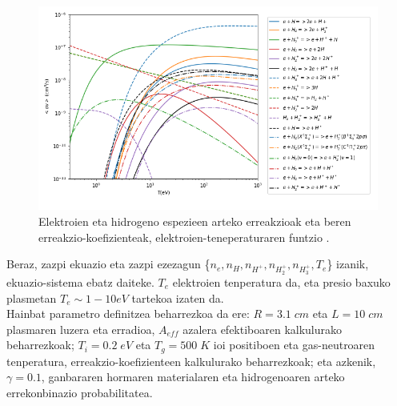\documentclass[12pt]{article}
\numberwithin{figure}{section}
\numberwithin{equation}{section}
\begin{document}
\begin{figure} [h]
    \centering
    \includegraphics[width=0.9\linewidth]{2 - Oinarri teorikoa/hidrogeno erreakzioak.png}
    \caption{Elektroien eta hidrogeno espezieen arteko erreakzioak eta beren erreakzio-koefizienteak, elektroien-teneperaturaren funtzio \cite{elorza_romera_modelo_2022}.}
    \label{fig:plasmaerreakzioak}
\end{figure}

Beraz, zazpi ekuazio eta zazpi ezezagun \{$n_e,n_H,n_{H^+},n_{H_2^+}, n_{H_3^+}, T_e$\} izanik, ekuazio-sistema ebatz daiteke. $T_e$ elektroien tenperatura da, eta presio baxuko plasmetan $T_e \sim 1-10eV$ tartekoa izaten da.\\

Hainbat parametro definitzea beharrezkoa da ere: $R=\num{3.1}\;cm$ eta $L=10\;cm$ plasmaren luzera eta erradioa, $A_{eff}$ azalera efektiboaren kalkulurako beharrezkoak; $T_i=\num{0.2}\;eV$ eta $T_g=500\;K$ ioi positiboen eta gas-neutroaren tenperatura, erreakzio-koefizienteen kalkulurako beharrezkoak; eta azkenik, $\gamma=\num{0.1}$, ganbararen hormaren materialaren eta hidrogenoaren arteko errekonbinazio probabilitatea.\\
\end{document}
